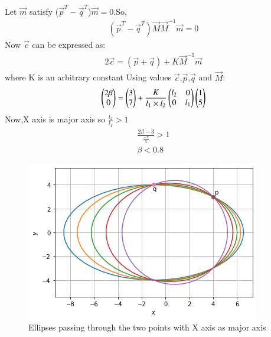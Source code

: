 \documentclass[journal,12pt,twocolumn]{IEEEtran}
\begin{document}
Let $\vec{m}$ satisfy ($\vec{p}^T-\vec{q}^T$)$\vec{m}=0$.So,
\begin{align}
    (\vec{p}^T-\vec{q}^T)\vec{M}\vec{M}^{-1}\vec{m}=0
\end{align}
Now $\vec{c}$ can be expressed as:
\begin{align}
2\vec{c}=(\vec{p}+\vec{q})+K\vec{M}^{-1}\vec{m}
\end{align}
where K is an arbitrary constant
Using values $\vec{c}$,$\vec{p}$,$\vec{q}$ and $\vec{M}$:
\begin{align}
 \begin{pmatrix}2\beta\\0\end{pmatrix}=\begin{pmatrix}3\\7\end{pmatrix}+\frac{K}{l_1\times l_2}\begin{pmatrix}l_2 & 0 \\ 0 & l_1\end{pmatrix}\begin{pmatrix}1\\5\end{pmatrix}
\end{align}
Now,X axis is major axis so 
$\frac{l_2}{l_1}>1$
\begin{align}
    \frac{2\beta-3}{\frac{-7}{5}}>1\\
    \beta<0.8
\end{align}

\begin{figure}[!ht]
\centering
\includegraphics[width=\columnwidth]{figure5_1}
\caption{Ellipses passing through the two points with X axis as major axis}
\label{fig:ellipses}	
\end{figure}
\end{document}
